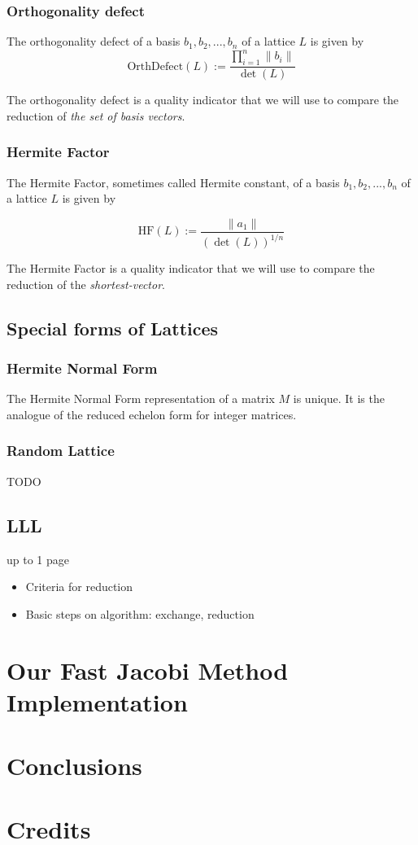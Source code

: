 \documentclass[10pt]{article}
\begin{document}
\subsubsection{Orthogonality defect}
The orthogonality defect of a basis $b_1, b_2,...,b_n$ of a lattice $L$ is given by
\[
    \text{OrthDefect}(L) := \frac{\displaystyle\prod^{n}_{i=1} \|b_i\| }{\det(L)}
\]

The orthogonality defect is a quality indicator that we will use to compare the reduction of \emph{the set of basis vectors}.

\subsubsection{Hermite Factor}
The Hermite Factor, sometimes called Hermite constant, of a basis $b_1, b_2,...,b_n$ of a lattice $L$ is given by

\[
    \text{HF}(L) := \frac{\|a_1\|}{(\det(L))^{1/n}}
\]

The Hermite Factor is a quality indicator that we will use to compare the reduction of the \emph{shortest-vector}.

\subsection{Special forms of Lattices}

\subsubsection{Hermite Normal Form}

The Hermite Normal Form representation of a matrix $M$ is unique. It is the analogue of the reduced echelon form for integer matrices.

\subsubsection{Random Lattice}

TODO

\subsection{LLL}
up to 1 page
\begin{itemize}
\item Criteria for reduction
\item Basic steps on algorithm: exchange, reduction
\end{itemize}

\section{Our Fast Jacobi Method Implementation}

\section{Conclusions}




\section{Credits}
\end{document}
